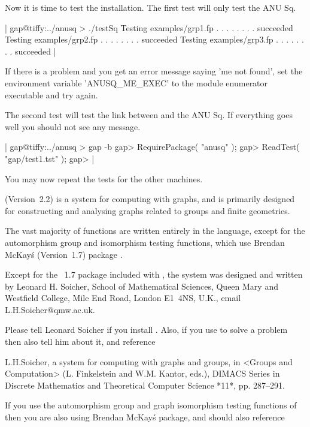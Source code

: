 Now it is time to test  the installation.  The  first test will only test
the ANU Sq.

|    gap@tiffy:../anusq > ./testSq
    Testing examples/grp1.fp  . . . . . . . . succeeded
    Testing examples/grp2.fp  . . . . . . . . succeeded
    Testing examples/grp3.fp  . . . . . . . . succeeded |

If there is a problem  and you get an error message saying 'me not found',
set the  environment variable 'ANUSQ\_ME\_EXEC'  to the module enumerator
executable and try again.

The  second test will  test the link between {\GAP}   and the ANU Sq.  If
everything goes well you should not see any message.

|    gap@tiffy:../anusq > gap -b
    gap> RequirePackage( "anusq" );
    gap> ReadTest( "gap/test1.tst" );
    gap> |

You may now repeat the tests for the other machines.


{\GRAPE}  (Version~2.2)  is  a system for  computing with graphs,  and is
primarily  designed  for constructing  and analysing  graphs  related  to
groups and finite geometries.

The vast  majority  of {\GRAPE}  functions  are written entirely  in  the
{\GAP}  language,  except  for  the  automorphism  group  and isomorphism
testing  functions,  which use  Brendan  McKay\'s  {\nauty} (Version~1.7)
package \cite{Nau90}.

Except for the {\nauty}~1.7 package included with  {\GRAPE}, the {\GRAPE}
system  was designed  and  written by Leonard   H.   Soicher,  School  of
Mathematical Sciences, Queen Mary  and Westfield College,  Mile End Road,
London E1~4NS, U.K., email\: L.H.Soicher@qmw.ac.uk.

Please tell Leonard  Soicher if  you install  {\GRAPE}.  Also, if you use
{\GRAPE} to solve a problem then also tell him about it, and reference

L.H.Soicher, {\GRAPE\:} a system for computing with graphs and groups, in
<Groups and Computation>  (L. Finkelstein and W.M. Kantor, eds.),  DIMACS 
Series  in Discrete  Mathematics and  Theoretical Computer Science  *11*, 
pp. 287--291.

If you use the automorphism group and graph isomorphism testing functions
of {\GRAPE} then you  are  also using Brendan McKay\'s  {\nauty} package,
and should also reference


